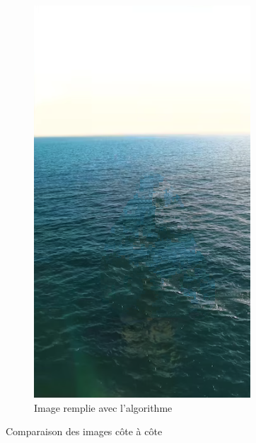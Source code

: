 \documentclass[10pt]{article}
\begin{document}
\begin{figure}[h]
\begin{subfigure}{0.3\textwidth}
        \centering
        \includegraphics[width=\textwidth]{images/image_sailboat_inpaint.png}
        \caption{Image remplie avec l'algorithme}
    \end{subfigure}
    \caption{Comparaison des images côte à côte}
\end{figure}
\end{document}
